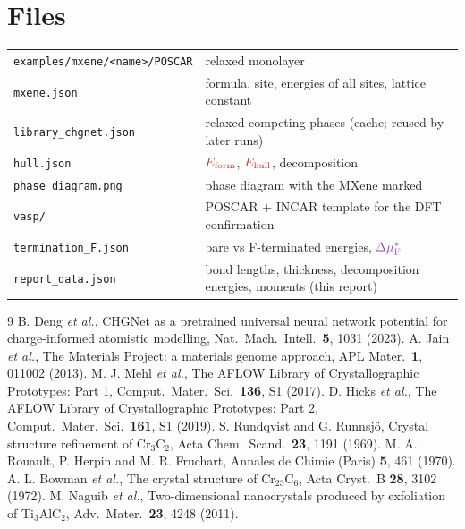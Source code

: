 \documentclass[11pt,a4paper]{article}
\newcommand{\Ef}{\textcolor{ecol}{E_{\mathrm{form}}}}
\newcommand{\Eh}{\textcolor{ecol}{E_{\mathrm{hull}}}}
\newcommand{\dmustar}{\textcolor{mucol}{\Delta\mu_{\mathrm F}^{*}}}
\begin{document}
\section{Files}
\begin{tabularx}{\textwidth}{@{}lX@{}}
\toprule
\texttt{examples/mxene/<name>/POSCAR} & relaxed monolayer\\
\texttt{mxene.json} & formula, site, energies of all sites, lattice constant\\
\texttt{library\_chgnet.json} & relaxed competing phases (cache; reused by later runs)\\
\texttt{hull.json} & $\Ef$, $\Eh$, decomposition\\
\texttt{phase\_diagram.png} & phase diagram with the MXene marked\\
\texttt{vasp/} & POSCAR + INCAR template for the DFT confirmation\\
\texttt{termination\_F.json} & bare vs F-terminated energies, $\dmustar$\\
\texttt{report\_data.json} & bond lengths, thickness, decomposition energies, moments (this report)\\
\bottomrule
\end{tabularx}

\begin{thebibliography}{9}\small
{} B. Deng \emph{et al.}, CHGNet as a pretrained universal neural network potential for charge-informed atomistic modelling, Nat.\ Mach.\ Intell.\ \textbf{5}, 1031 (2023).
 A. Jain \emph{et al.}, The Materials Project: a materials genome approach, APL Mater.\ \textbf{1}, 011002 (2013).
 M. J. Mehl \emph{et al.}, The AFLOW Library of Crystallographic Prototypes: Part 1, Comput.\ Mater.\ Sci.\ \textbf{136}, S1 (2017).
 D. Hicks \emph{et al.}, The AFLOW Library of Crystallographic Prototypes: Part 2, Comput.\ Mater.\ Sci.\ \textbf{161}, S1 (2019).
 S. Rundqvist and G. Runnsjö, Crystal structure refinement of Cr$_3$C$_2$, Acta Chem.\ Scand.\ \textbf{23}, 1191 (1969).
 M. A. Rouault, P. Herpin and M. R. Fruchart, Annales de Chimie (Paris) \textbf{5}, 461 (1970).
 A. L. Bowman \emph{et al.}, The crystal structure of Cr$_{23}$C$_6$, Acta Cryst.\ B \textbf{28}, 3102 (1972).
 M. Naguib \emph{et al.}, Two-dimensional nanocrystals produced by exfoliation of Ti$_3$AlC$_2$, Adv.\ Mater.\ \textbf{23}, 4248 (2011).
\end{thebibliography}
\end{document}
